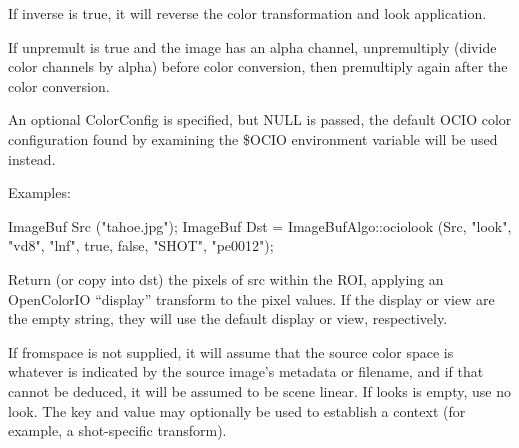 If {\cf inverse} is {\cf true}, it will reverse the color transformation
and look application.

If {\cf unpremult} is {\cf true} and the image has an alpha channel,
unpremultiply (divide color channels by alpha) before color conversion, then
premultiply again after the color conversion.

An optional {\cf ColorConfig} is specified, but {\cf NULL} is passed, the
default OCIO color configuration found by examining the {\cf \$OCIO}
environment variable will be used instead.

\smallskip
\noindent Examples:
\begin{code}
    ImageBuf Src ("tahoe.jpg");
    ImageBuf Dst = ImageBufAlgo::ociolook (Src, "look", "vd8", "lnf",
                                           true, false, "SHOT", "pe0012");
\end{code}
\apiend


 
Return (or copy into {\cf dst}) the pixels of {\cf src} within the ROI,
applying an OpenColorIO ``display'' transform to the pixel values. If the
{\cf display} or {\cf view} are the empty string, they will use the default
display or view, respectively.

If {\cf fromspace} is not supplied, it will assume that the source color
space is whatever is indicated by the source image's metadata or filename,
and if that cannot be deduced, it will be assumed to be scene linear. If
{\cf looks} is empty, use no look. The {\cf key} and {\cf value} may
optionally be used to establish a context (for example, a shot-specific
transform).

